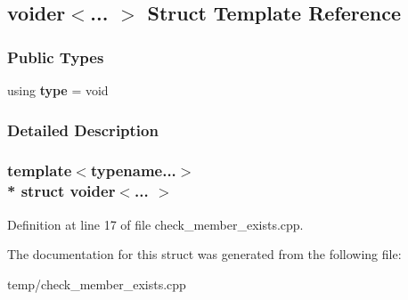 \hypertarget{structvoider}{}\subsection{voider$<$... $>$ Struct Template Reference}
\label{structvoider}
\subsubsection*{Public Types}
\begin{DoxyCompactItemize}
\item 
using {\bfseries type} = void\hypertarget{structvoider_adf446ae2396694b870dc22e8f95ffd60}{}\label{structvoider_adf446ae2396694b870dc22e8f95ffd60}

\end{DoxyCompactItemize}


\subsubsection{Detailed Description}
\subsubsection*{template$<$typename...$>$\\*
struct voider$<$... $>$}



Definition at line 17 of file check\+\_\+member\+\_\+exists.\+cpp.



The documentation for this struct was generated from the following file\+:\begin{DoxyCompactItemize}
\item 
temp/check\+\_\+member\+\_\+exists.\+cpp\end{DoxyCompactItemize}

